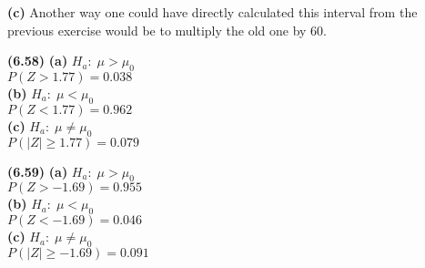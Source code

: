 \documentclass[11pt]{article}
\renewcommand\part[1]{\vspace{.10in}\textbf{(#1)}}
\begin{document}
		\part{c}
			Another way one could have directly calculated this interval from the previous exercise would be to multiply the old one by 60.\par
			
	\part{6.58}
		\part{a}
			$H_{a}:\; \mu > \mu_{0}$\\
			$P(Z>1.77)=0.038$\\
		\part{b}
			$H_{a}:\; \mu < \mu_{0}$\\
			$P(Z<1.77)=0.962$\\
		\part{c}
			$H_{a}:\; \mu \neq \mu_{0}$\\
			$P(|Z| \geq 1.77)=0.079$\par
			
	\part{6.59}
		\part{a}
			$H_{a}:\; \mu > \mu_{0}$\\
			$P(Z>-1.69)=0.955$\\
		\part{b}
			$H_{a}:\; \mu < \mu_{0}$\\
			$P(Z<-1.69)=0.046$\\
		\part{c}
			$H_{a}:\; \mu \neq \mu_{0}$\\
			$P(|Z| \geq -1.69)=0.091$\par
			
\end{document}
